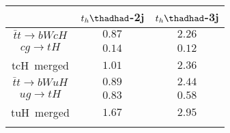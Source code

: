 \centering
\begin{tabular}{ccc} \toprule\toprule
 & $t_{h}\thadhad$-2j& $t_{h}\thadhad$-3j\\\midrule
$\bar{t}t\to bWcH$ &  $0.87$ & $2.26$  \\
$cg\to tH$ &          $0.14$ & $0.12$ \\
tcH~merged &          $1.01$ & $2.36$ \\
$\bar{t}t\to bWuH$ &  $0.89$ & $2.44$ \\
$ug\to tH$ &          $0.83$ & $0.58$  \\
tuH~merged &          $1.67$ & $2.95$  \\
\bottomrule\bottomrule\\
\end{tabular}